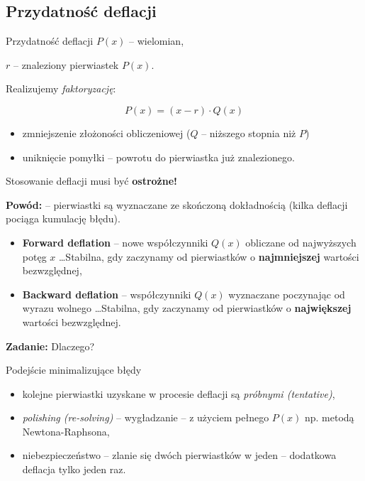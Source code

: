 \subsection{Przydatność deflacji}

\begin{frame}{Przydatność deflacji}
  $P(x)$ -- wielomian,

  $r$ -- znaleziony pierwiastek $P(x)$.

  Realizujemy \textit{faktoryzację}:
  \begin{block}{}
    $$ P(x) = (x - r) \cdot Q(x) $$
  \end{block}

  \begin{itemize}
    \item zmniejszenie złożoności obliczeniowej ($Q$ -- niższego stopnia niż $P$)
    \item uniknięcie pomyłki -- powrotu do pierwiastka już znalezionego.
  \end{itemize}
\end{frame}

\begin{frame}
  Stosowanie deflacji musi być \textbf{ostrożne!}

  \textbf{Powód:} -- pierwiastki są wyznaczane ze skończoną dokładnością (kilka deflacji pociąga kumulację błędu).

  \begin{block}{}
    \begin{itemize}
      \item \textbf{Forward deflation} -- nowe współczynniki $Q(x)$ obliczane od najwyższych potęg $x$ \dots Stabilna, gdy zaczynamy od pierwiastków o \textbf{najmniejszej} wartości bezwzględnej,
      \item \textbf{Backward deflation} -- współczynniki $Q(x)$ wyznaczane poczynając od wyrazu wolnego \dots Stabilna, gdy zaczynamy od pierwiastków o \textbf{największej} wartości bezwzględnej.
    \end{itemize}
  \end{block}

  \textbf{Zadanie:} Dlaczego?
\end{frame}

\begin{frame}
  \begin{block}{Podejście minimalizujące błędy}
    \begin{itemize}
      \item kolejne pierwiastki uzyskane w procesie deflacji są \textit{próbnymi (tentative)},
      \item \textit{polishing (re-solving)} -- wygładzanie -- z użyciem pełnego $P(x)$ np. metodą Newtona-Raphsona,
      \item niebezpieczeństwo -- zlanie się dwóch pierwiastków w jeden -- dodatkowa deflacja tylko jeden raz.
    \end{itemize}
  \end{block}
\end{frame}
